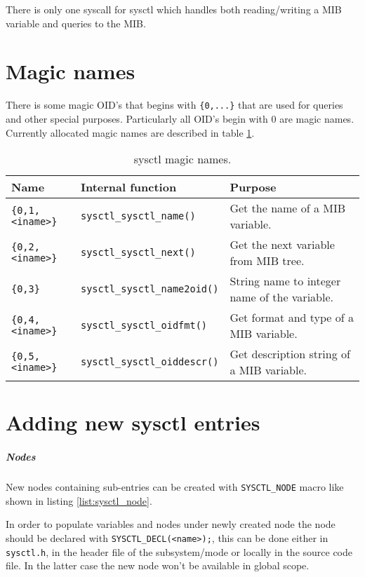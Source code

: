 There is only one syscall for sysctl which handles both reading/writing a
\ac{MIB} variable and queries to the MIB.

\section{Magic names}

There is some magic OID's that begins with \verb+{0,...}+ that are used for
queries and other special purposes. Particularly all OID's begin with 0 are
magic names. Currently allocated magic names are described in table
\ref{table:sysctlmagic}.

\begin{table}
\caption{sysctl magic names.}
\label{table:sysctlmagic}
\begin{tabular}{lll}
Name                & Internal function        & Purpose\\
\hline
\verb+{0,1,<iname>}+ & \verb+sysctl_sysctl_name()+     & Get the name of a MIB variable.\\
\verb+{0,2,<iname>}+ & \verb+sysctl_sysctl_next()+     & Get the next variable from MIB tree.\\
\verb+{0,3}+            & \verb+sysctl_sysctl_name2oid()+ & String name to integer name of the variable.\\
\verb+{0,4,<iname>}+ & \verb+sysctl_sysctl_oidfmt()+   & Get format and type of a MIB variable.\\
\verb+{0,5,<iname>}+ & \verb+sysctl_sysctl_oiddescr()+ & Get description string of a MIB variable.
\end{tabular}
\end{table}

\section{Adding new sysctl entries}

\subparagraph{Nodes}
New nodes containing sub-entries can be created with \verb+SYSCTL_NODE+ macro
like shown in listing \ref{list:sysctl_node}.



In order to populate variables and nodes under newly created node the node
should be declared with \verb+SYSCTL_DECL(<name>);+, this can be done either in
\verb+sysctl.h+, in the header file of the subsystem/mode or locally in the
source code file. In the latter case the new node won't be available in
global scope.

